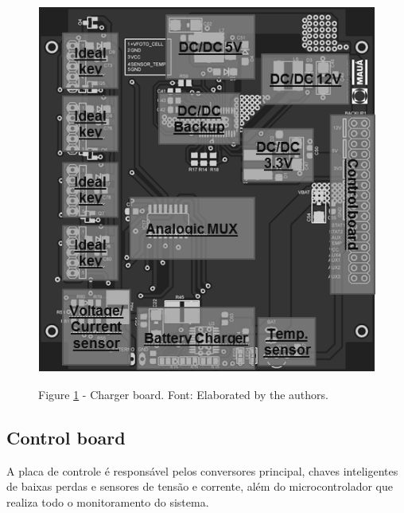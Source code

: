 \documentclass[final,3p,times,twocolumn,authoryear]{elsarticle}
\begin{document}
	\begin{figure}[th]
		\label{charger}
		\centering
		\includegraphics[width=0.9\linewidth]{./figs/charger}
			
		\begin{small}
		Figure \ref{charger} - Charger board. Font: Elaborated by the authors.
		\end{small}		
	\end{figure}


\subsection{Control board}
\label{Control board}

	A placa de controle é responsável pelos conversores principal, chaves inteligentes de baixas perdas e sensores de tensão e corrente, além do microcontrolador que realiza todo o monitoramento do sistema.
	
\end{document}
